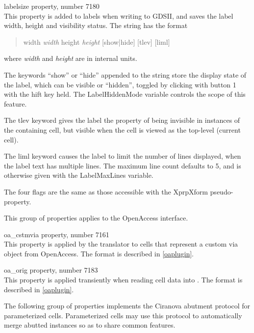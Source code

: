 \begin{description}
\item{\et labelsize} property, number 7180\\
This property is added to labels when writing to GDSII, and saves the
label width, height and visibility status.  The string has the format
\begin{quote}
{\vt width} {\it width} {\vt height} {\it height} [{\vt show}|{\vt hide}]
 [{\vt tlev}] [{\vt liml}]
\end{quote}
where {\it width} and {\it height} are in internal units.

The keywords ``{\vt show}'' or ``{\vt hide}'' appended to the string
store the display state of the label, which can be visible or
``hidden'', toggled by clicking with button 1 with the {\kb hift} key
held.  The {\et LabelHiddenMode} variable controls the scope of this
feature.

The {\vt tlev} keyword gives the label the property of being invisible
in instances of the containing cell, but visible when the cell is
viewed as the top-level (current cell).

The {\vt liml} keyword causes the label to limit the number of lines
displayed, when the label text has multiple lines.  The maximum line
count defaults to 5, and is otherwise given with the {\vt
LabelMaxLines} variable.

The four flags are the same as those accessible with the {\et
XprpXform} pseudo-property.
\end{description}

\ifoa
This group of properties applies to the OpenAccess interface.

\begin{description}
\item{\et oa\_cstmvia} property, number 7161\\
This property is applied by the translator to {\Xic} cells that
represent a custom via object from OpenAccess.  The format is
described in \ref{oaplugin}.

\item{\et oa\_orig} property, number 7183\\
This property is applied transiently when reading cell data into
{\Xic}.  The format is described in \ref{oaplugin}.
\end{description}
\fi

The following group of properties implements the Ciranova abutment
protocol for parameterized cells.  Parameterized cells may use this
protocol to automatically merge abutted instances so as to share
common features.

